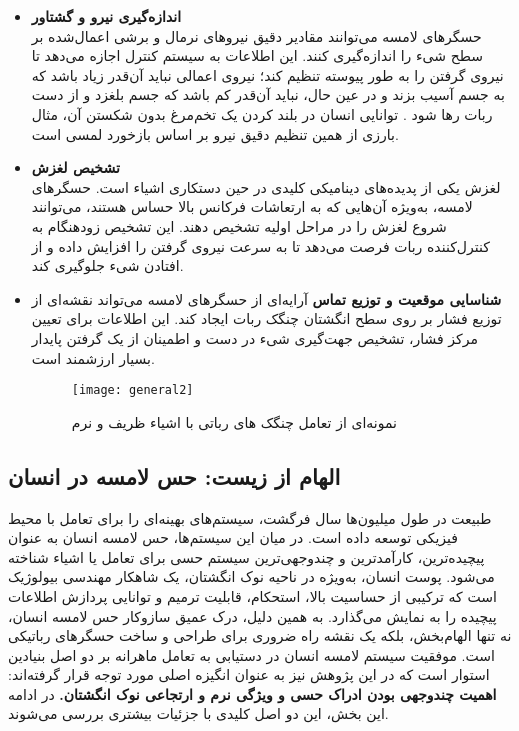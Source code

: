  \begin{itemize}
 	\item \textbf{اندازه‌گیری نیرو و گشتاور } 
 	\\
حسگرهای لامسه می‌توانند مقادیر دقیق نیروهای نرمال و برشی اعمال‌شده بر سطح شیء را اندازه‌گیری کنند. این اطلاعات به سیستم کنترل اجازه می‌دهد تا نیروی گرفتن را به طور پیوسته تنظیم کند؛ نیروی اعمالی نباید آن‌قدر زیاد باشد که به جسم آسیب بزند و در عین حال، نباید آن‌قدر کم باشد که جسم بلغزد و از دست ربات رها شود
 	\cite{piga2023adaptive}
 	. توانایی انسان در بلند کردن یک تخم‌مرغ بدون شکستن آن، مثال بارزی از همین تنظیم دقیق نیرو بر اساس بازخورد لمسی است.
 	 
 	 \item \textbf{تشخیص لغزش} 
 	 \\
لغزش یکی از پدیده‌های دینامیکی کلیدی در حین دستکاری اشیاء است. حسگرهای لامسه، به‌ویژه آن‌هایی که به ارتعاشات فرکانس بالا حساس هستند، می‌توانند شروع لغزش را در مراحل اولیه تشخیص دهند. این تشخیص زودهنگام به کنترل‌کننده ربات فرصت می‌دهد تا به سرعت نیروی گرفتن را افزایش داده و از افتادن شیء جلوگیری کند.
 	 \cite{kyberd2023slip,costanzo2018slipping}
 	 
 	 \item \textbf{شناسایی موقعیت و توزیع تماس}
آرایه‌ای از حسگرهای لامسه می‌تواند نقشه‌ای از توزیع فشار بر روی سطح انگشتان چنگک ربات ایجاد کند. این اطلاعات برای تعیین مرکز فشار، تشخیص جهت‌گیری شیء در دست و اطمینان از یک گرفتن پایدار بسیار ارزشمند است.
\cite{khamis_novel_2019,de2022soft,wang_low-cost_2016}
\\
 \begin{figure}[ht]
	\centerline{\texttt{[image: general2]}}
	\caption{نمونه‌ای از تعامل چنگک های رباتی با اشیاء ظریف و نرم
		\cite{zhang2020state}
	}
	\label{fig:general1}
\end{figure}
 \end{itemize} 
\subsection{الهام از زیست: حس لامسه در انسان}
طبیعت در طول میلیون‌ها سال فرگشت، سیستم‌های بهینه‌ای را برای تعامل با محیط فیزیکی توسعه داده است. در میان این سیستم‌ها، حس لامسه انسان به عنوان پیچیده‌ترین، کارآمدترین و چندوجهی‌ترین سیستم حسی برای تعامل یا اشیاء شناخته می‌شود. پوست انسان، به‌ویژه در ناحیه نوک انگشتان، یک شاهکار مهندسی بیولوژیک است که ترکیبی از حساسیت بالا، استحکام، قابلیت ترمیم و توانایی پردازش اطلاعات پیچیده را به نمایش می‌گذارد. به همین دلیل، درک عمیق سازوکار حس لامسه انسان، نه تنها الهام‌بخش، بلکه یک نقشه راه ضروری برای طراحی و ساخت  حسگرهای رباتیکی است. 
\cite{silvera2015artificial}
موفقیت سیستم لامسه انسان در دستیابی به تعامل ماهرانه
 بر دو اصل بنیادین استوار است که در این پژوهش نیز به عنوان انگیزه اصلی مورد توجه قرار گرفته‌اند: 
 \textbf{اهمیت چندوجهی بودن ادراک حسی و ویژگی نرم و ارتجاعی نوک انگشتان.}
 در ادامه این بخش، این دو اصل کلیدی با جزئیات بیشتری بررسی می‌شوند.
